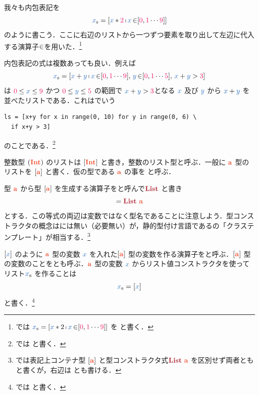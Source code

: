 \documentclass[a5paper,twoside,fleqn,draft]{jsbook}
\begin{document}
我々も内包表記を
\begin{equation}
  \mList{x}
  =[\hVar{x}*\mTwoNumber\mListComp\hVar{x}\mFrom[\hConstant{0},\hConstant{1}\dotsb\mNineNumber]]
\end{equation}
のように書こう．ここに右辺のリストから一つずつ要素を取り出して左辺に代入する演算子$\operatorname{\in}$を用いた．\footnote{\haskell では $\mList{x}=[\hVar{x}*2\mListComp\hVar{x}\mFrom[\hConstant{0},\hConstant{1}\dotsb\mNineNumber]]$ を  と書く．}

内包表記の式は複数あっても良い．例えば
\begin{equation}
  \mList{x}
  =[\hVar{x}+\hVar{y}\mListComp\hVar{x}\mFrom[\hConstant{0},\hConstant{1}\dotsb\mNineNumber],\,\hVar{y}\mFrom[\hConstant{0},\hConstant{1}\dotsb\mFiveNumber],\,\hVar{x}+\hVar{y}>\mThreeNumber]
\end{equation}
は $\hConstant{0}\le\hVar{x}\le\mNineNumber$ かつ $\hConstant{0}\le\hVar{y}\le\mFiveNumber$ の範囲で $\hVar{x}+\hVar{y}>\mThreeNumber$となる $\hVar{x}$ 及び $\hVar{y}$ から $\hVar{x}+\hVar{y}$ を並べたリストである．これは\python でいう
\begin{pythoncode}
\begin{verbatim}
ls = [x+y for x in range(0, 10) for y in range(0, 6) \
  if x+y > 3]
\end{verbatim}
\end{pythoncode}
のことである．\footnote{\haskell では  と書く．}


整数型 $(\mIntType)$ のリストは $[\mIntType]$ と書き，整数のリスト型と呼ぶ．一般に $\mA$ 型のリストを $[\mA]$ と書く．仮の型である $\mA$ の事を と呼ぶ．

型 $\mA$ から型 $[\mA]$ を生成する演算子をと呼んで$\mListTypeConstructor$ と書き
\begin{equation}
  [\mA]
  =\mListTypeConstructor\,\mA
\end{equation}
とする．この等式の両辺は変数ではなく型名であることに注意しよう．型コンストラクタの概念は\python には無い（必要無い）が，静的型付け言語である\cxx の「クラステンプレート」が相当する．\footnote{\haskell では表記上コンテナ型 $[\mA]$ と型コンストラクタ式$\mListTypeConstructor\,\mA $ を区別せず両者とも \code{[a]} と書くが，右辺は  とも書ける．}

$[\hVar{x}]$ のように $\mA$ 型の変数 $\hVar{x}$ を入れた$[\mA]$ 型の変数を作る演算子をと呼ぶ．$[\mA]$ 型の変数のことをとも呼ぶ．$\mA$ 型の変数 $\hVar{x}$ からリスト値コンストラクタを使ってリスト$\mList{x}$ を作ることは
\begin{equation}
  \mList{x}
  =[\hVar{x}]
\end{equation}
と書く．\footnote{\haskell では  と書く．}
\end{document}
